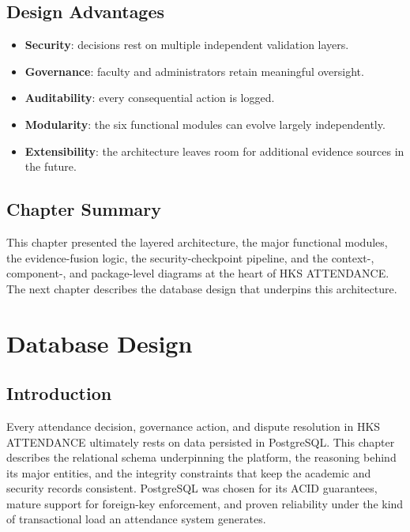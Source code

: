\documentclass[12pt, a4paper, oneside]{report}
\begin{document}
\section{Design Advantages}
\begin{itemize}
    \item \textbf{Security}: decisions rest on multiple independent validation layers.
    \item \textbf{Governance}: faculty and administrators retain meaningful oversight.
    \item \textbf{Auditability}: every consequential action is logged.
    \item \textbf{Modularity}: the six functional modules can evolve largely independently.
    \item \textbf{Extensibility}: the architecture leaves room for additional evidence sources in the future.
\end{itemize}

\section{Chapter Summary}

This chapter presented the layered architecture, the major functional modules, the evidence-fusion logic, the security-checkpoint pipeline, and the context-, component-, and package-level diagrams at the heart of HKS ATTENDANCE. The next chapter describes the database design that underpins this architecture.

\chapter{Database Design}
\label{chap:database}

\section{Introduction}

Every attendance decision, governance action, and dispute resolution in HKS ATTENDANCE ultimately rests on data persisted in PostgreSQL. This chapter describes the relational schema underpinning the platform, the reasoning behind its major entities, and the integrity constraints that keep the academic and security records consistent. PostgreSQL was chosen for its ACID guarantees, mature support for foreign-key enforcement, and proven reliability under the kind of transactional load an attendance system generates.
\end{document}

